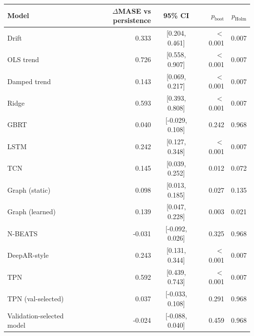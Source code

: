 \begin{tabular}{@{}lrcrr@{}}
\toprule
Model & $\Delta$MASE vs persistence & 95\% CI & $p_{\mathrm{boot}}$ & $p_{\mathrm{Holm}}$ \\
\midrule
Drift & 0.333 & [0.204, 0.461] & $<$0.001 & 0.007 \\
OLS trend & 0.726 & [0.558, 0.907] & $<$0.001 & 0.007 \\
Damped trend & 0.143 & [0.069, 0.217] & $<$0.001 & 0.007 \\
Ridge & 0.593 & [0.393, 0.808] & $<$0.001 & 0.007 \\
GBRT & 0.040 & [-0.029, 0.108] & 0.242 & 0.968 \\
LSTM & 0.242 & [0.127, 0.348] & $<$0.001 & 0.007 \\
TCN & 0.145 & [0.039, 0.252] & 0.012 & 0.072 \\
Graph (static) & 0.098 & [0.013, 0.185] & 0.027 & 0.135 \\
Graph (learned) & 0.139 & [0.047, 0.228] & 0.003 & 0.021 \\
N-BEATS & -0.031 & [-0.092, 0.026] & 0.325 & 0.968 \\
DeepAR-style & 0.243 & [0.131, 0.344] & $<$0.001 & 0.007 \\
TPN & 0.592 & [0.439, 0.743] & $<$0.001 & 0.007 \\
TPN (val-selected) & 0.037 & [-0.033, 0.108] & 0.291 & 0.968 \\
Validation-selected model & -0.024 & [-0.088, 0.040] & 0.459 & 0.968 \\
\bottomrule
\end{tabular}
